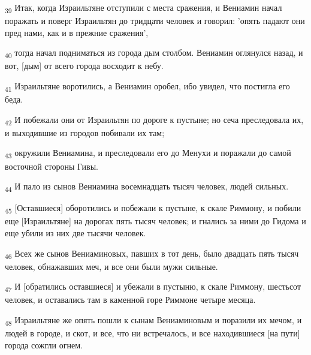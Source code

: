 \begin{tcolorbox}
\textsubscript{39} Итак, когда Израильтяне отступили с места сражения, и Вениамин начал поражать и поверг Израильтян до тридцати человек и говорил: 'опять падают они пред нами, как и в прежние сражения',
\end{tcolorbox}
\begin{tcolorbox}
\textsubscript{40} тогда начал подниматься из города дым столбом. Вениамин оглянулся назад, и вот, [дым] от всего города восходит к небу.
\end{tcolorbox}
\begin{tcolorbox}
\textsubscript{41} Израильтяне воротились, а Вениамин оробел, ибо увидел, что постигла его беда.
\end{tcolorbox}
\begin{tcolorbox}
\textsubscript{42} И побежали они от Израильтян по дороге к пустыне; но сеча преследовала их, и выходившие из городов побивали их там;
\end{tcolorbox}
\begin{tcolorbox}
\textsubscript{43} окружили Вениамина, и преследовали его до Менухи и поражали до самой восточной стороны Гивы.
\end{tcolorbox}
\begin{tcolorbox}
\textsubscript{44} И пало из сынов Вениамина восемнадцать тысяч человек, людей сильных.
\end{tcolorbox}
\begin{tcolorbox}
\textsubscript{45} [Оставшиеся] оборотились и побежали к пустыне, к скале Риммону, и побили еще [Израильтяне] на дорогах пять тысяч человек; и гнались за ними до Гидома и еще убили из них две тысячи человек.
\end{tcolorbox}
\begin{tcolorbox}
\textsubscript{46} Всех же сынов Вениаминовых, павших в тот день, было двадцать пять тысяч человек, обнажавших меч, и все они были мужи сильные.
\end{tcolorbox}
\begin{tcolorbox}
\textsubscript{47} И [обратились оставшиеся] и убежали в пустыню, к скале Риммону, шестьсот человек, и оставались там в каменной горе Риммоне четыре месяца.
\end{tcolorbox}
\begin{tcolorbox}
\textsubscript{48} Израильтяне же опять пошли к сынам Вениаминовым и поразили их мечом, и людей в городе, и скот, и все, что ни встречалось, и все находившиеся [на пути] города сожгли огнем.
\end{tcolorbox}
